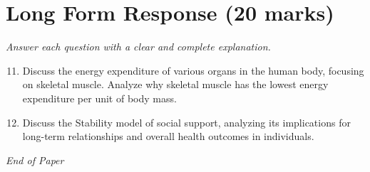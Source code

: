 \documentclass[12pt]{article}
\begin{document}
\section*{Long Form Response (20 marks)}
\textit{Answer each question with a clear and complete explanation.}
\begin{enumerate}[label=\arabic*.]
\setcounter{enumi}{10}
\item Discuss the energy expenditure of various organs in the human body, focusing on skeletal muscle. Analyze why skeletal muscle has the lowest energy expenditure per unit of body mass.
\item Discuss the Stability model of social support, analyzing its implications for long-term relationships and overall health outcomes in individuals.
\end{enumerate}

\vfill
\noindent\textit{End of Paper}
\end{document}
